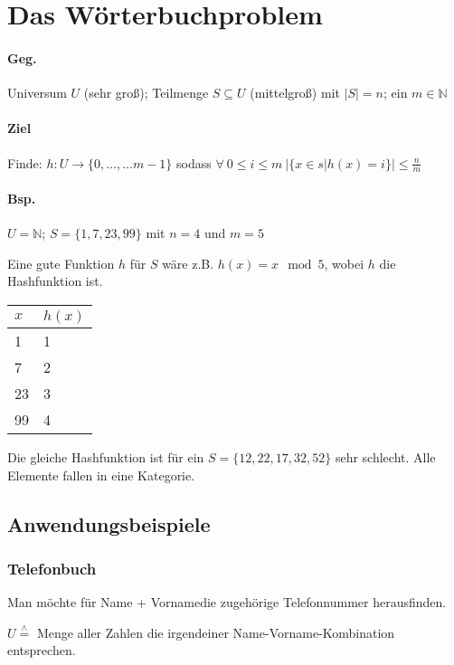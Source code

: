 \section{Das Wörterbuchproblem}

\paragraph*{Geg.} Universum $U$ (sehr groß); Teilmenge $S \subseteq U$ (mittelgroß) mit $|S|=n$; ein $m \in \mathbb{N}$

\paragraph*{Ziel} Finde: $h: U \rightarrow \{ 0,\dots,\dots m-1 \}$ sodass $\forall\ 0 \leq i \leq m\ \big| \{ x \in s | h(x)=i \} \big| \leq \frac{n}{m}$

\paragraph*{Bsp.} $U=\mathbb{N}$; $S=\{ 1,7,23,99 \}$ mit $n=4$ und $m=5$

Eine gute Funktion $h$ für $S$ wäre z.B. $h(x)=x \mod 5$, wobei $h$ die Hashfunktion ist.
\begin{table}[htb!]
\centering
\begin{tabular}{l|l}
$x$ & $h(x)$ \\ 
\hline 
1 & 1 \\ 
7 & 2 \\ 
23 & 3 \\ 
99 & 4 \\ 
\end{tabular} 
\end{table}

Die gleiche Hashfunktion ist für ein $S = \{ 12,22,17,32,52 \}$ sehr schlecht. Alle Elemente fallen in eine Kategorie.


\subsection{Anwendungsbeispiele}

\subsubsection{Telefonbuch}
\minisec{} Man möchte für Name + Vornamedie zugehörige Telefonnummer herausfinden.

\minisec{} $U \overset{\wedge}{=}$ Menge aller Zahlen die irgendeiner Name-Vorname-Kombination entsprechen.


